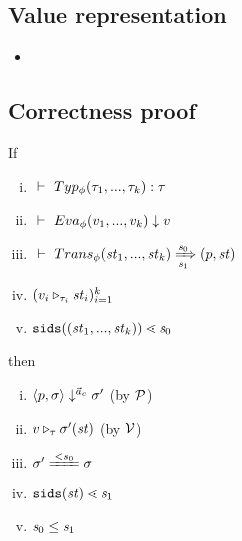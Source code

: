 \subsection{Value representation}
\begin{itemize}

\item {}

\begin{comment}
\PT{
	\AC{\ValRep {\lrange{v_1}{v_k}} {\tau} {\v}}
	\UC{\ValRep {\Seqk{v}}{\tseq{\tau}}{(\v,\langle \F_1,..., \F_k, \T \rangle)}}
}\\[4ex]

\item \Jug{\ValRep{\lrange{v_1}{v_k}}{\tau}{\v}}
\PT{
	\Axiom{\ValRep{\lrange{n_1}{n_k}}{\int}{\vrange{n_1}{n_k}}}
}
\PT{
	\AC{\ValRep{v_i}{\tau}{\v}}
	\UC{\ValRep{\lrange{v_1}{v_k}}{\tseq{\tau}}{}}
}

\end{comment}

\end{itemize}


\subsection{Correctness proof}
\begin{lem}
	If 
	\begin{enumerate}[(i)]
	\item $\Type{}{\TypeF{\Tupk{\tau}}}{\tau}$
	\item $\Eval{}{\EvalF{\Tupk{v}}}{v}$
	\item $\tranf{\st_1}{\st_k}{\s_0}{\s_1}{\sfun{p}{\st}}$
 	\item $(\ValRep{v_i}{\tau_i}{\st_i})^k_{i=1}$
 	\item $\sids{\Tupk{\st}} \SetLe \s_0$
	\end{enumerate}
 	then 
 	\begin{enumerate}[(i)]
 		\item $\seval{p}{\sgm}{\a_c}{\sgm'}$ (by $\MP$)
 		\item $\ValRep{v}{\tau}{\sgm'(\st)}$ (by $\MV$)
 		\item $\sgm' \ConEq{s_0} \sgm $
 		\item $\sids{\st} \SetLe \s_1$
 		\item $\s_0 \le \s_1$
 	\end{enumerate}
\end{lem}


